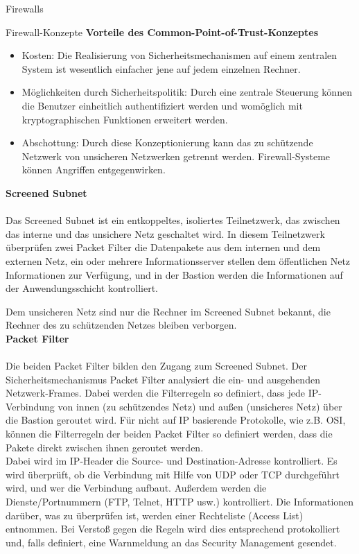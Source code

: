 \begin{section}{Firewalls}
\begin{subsection}{Firewall-Konzepte}
  	\textbf{Vorteile des Common-Point-of-Trust-Konzeptes}
  	\begin{itemize}
  		\item Kosten:
  			Die Realisierung von Sicherheitsmechanismen auf einem zentralen System ist wesentlich einfacher jene 
  			auf jedem einzelnen Rechner.
  		\item Möglichkeiten durch Sicherheitspolitik:
  			Durch eine zentrale Steuerung können die Benutzer einheitlich authentifiziert werden und womöglich 
  			mit kryptographischen Funktionen erweitert werden.
  		\item Abschottung:
  			Durch diese Konzeptionierung kann das zu schützende Netzwerk von unsicheren Netzwerken getrennt werden.
  			Firewall-Systeme können Angriffen entgegenwirken.
  	\end{itemize}
  	
  	\textbf{Screened Subnet} \cite{Firewall1} \\ \\
  	Das Screened Subnet ist ein entkoppeltes, isoliertes Teilnetzwerk, 
  	das zwischen das interne und das unsichere Netz geschaltet wird. 
  	In diesem Teilnetzwerk überprüfen zwei Packet Filter die Datenpakete 
  	aus dem internen und dem externen Netz, ein oder mehrere Informationsserver 
  	stellen dem öffentlichen Netz Informationen zur Verfügung, 
  	und in der Bastion werden die Informationen auf der Anwendungsschicht kontrolliert.

	Dem unsicheren Netz sind nur die Rechner im Screened Subnet bekannt, 
	die Rechner des zu schützenden Netzes bleiben verborgen. \\
	
	\textbf{Packet Filter} \cite{Firewall1} \\ \\
	Die beiden Packet Filter bilden den Zugang zum Screened Subnet. 
	Der Sicherheitsmechanismus Packet Filter analysiert die ein- und ausgehenden Netzwerk-Frames.
	Dabei werden die Filterregeln so definiert, dass jede IP-Verbindung von innen 
	(zu schützendes Netz) und außen (unsicheres Netz) über die Bastion geroutet wird. 
	Für nicht auf IP basierende Protokolle, wie z.B. \ac{OSI}, 
	können die Filterregeln der beiden Packet Filter so definiert werden, 
	dass die Pakete direkt zwischen ihnen geroutet werden.
	\\
	Dabei wird im IP-Header die Source- und Destination-Adresse kontrolliert.
	Es wird überprüft, ob die Verbindung mit Hilfe von UDP oder TCP durchgeführt wird, 
	und wer die Verbindung aufbaut. Außerdem werden die 
	Dienste/Portnummern (FTP, Telnet, HTTP usw.) kontrolliert. 
	Die Informationen darüber, was zu überprüfen ist, werden einer Rechteliste 
	(Access List) entnommen. Bei Verstoß gegen die Regeln wird dies entsprechend protokolliert und, 
	falls definiert, eine Warnmeldung an das Security Management gesendet. \\
	

\end{subsection}
\end{section}
